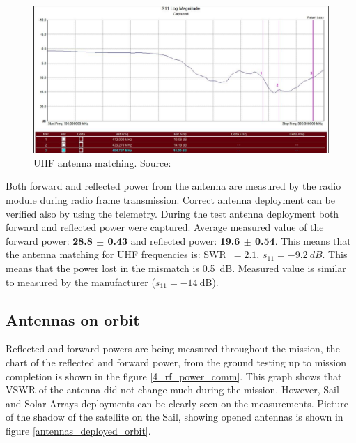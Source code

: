 \begin{figure}[H]
    \centering
    \includegraphics[width=0.8\paperwidth]{img/6/isis_s11_uhf.png}
    \caption{UHF antenna matching. Source: \cite{isis_ant_test_report}}
    \label{isis_s11_uhf}
\end{figure}

\newpage

Both forward and reflected power from the antenna are measured by the radio module during radio frame transmission. Correct antenna deployment can be verified also by using the telemetry. During the test antenna deployment both forward and reflected power were captured. Average measured value of the forward power: \textbf{\SI{28.8}{\dBm} $\pm$ \SI{0.43}{\dBm}} and reflected power: \textbf{\SI{19.6}{\dBm} $\pm$ \SI{0.54}{\dBm}}. This means that the antenna matching for UHF frequencies is: SWR~$= 2.1$, $s_{11} = -9.2~dB$. This means that the power lost in the mismatch is \SI{0.5}{\dB}. Measured value is similar to measured by the manufacturer ($s_{11} = \SI{-14}{\dB}$).

\subsection{Antennas on orbit}
Reflected and forward powers are being measured throughout the mission, the chart of the reflected and forward power, from the ground testing up to mission completion is shown in the figure \ref{4_rf_power_comm}. This graph shows that VSWR of the antenna did not change much during the mission. However, Sail and Solar Arrays deployments can be clearly seen on the measurements. Picture of the shadow of the satellite on the Sail, showing opened antennas is shown in figure \ref{antennas_deployed_orbit}.

